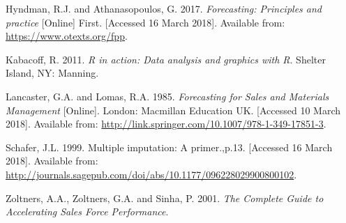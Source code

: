 \documentclass[11pt,]{article}
\begin{document}
\hypertarget{ref-hyndman_forecasting:_2017}{}
Hyndman, R.J. and Athana­sopou­los, G. 2017. \emph{Forecasting:
Principles and practice} {[}Online{]} First. {[}Accessed 16 March
2018{]}. Available from: \url{https://www.otexts.org/fpp}.

\hypertarget{ref-kabacoff_r_2011}{}
Kabacoff, R. 2011. \emph{R in action: Data analysis and graphics with
R}. Shelter Island, NY: Manning.

\hypertarget{ref-lancaster_forecasting_1985}{}
Lancaster, G.A. and Lomas, R.A. 1985. \emph{Forecasting for Sales and
Materials Management} {[}Online{]}. London: Macmillan Education UK.
{[}Accessed 10 March 2018{]}. Available from:
\url{http://link.springer.com/10.1007/978-1-349-17851-3}.

\hypertarget{ref-schafer_multiple_1999}{}
Schafer, J.L. 1999. Multiple imputation: A primer.,p.13. {[}Accessed 16
March 2018{]}. Available from:
\url{http://journals.sagepub.com/doi/abs/10.1177/096228029900800102}.

\hypertarget{ref-zoltners_complete_2001}{}
Zoltners, A.A., Zoltners, G.A. and Sinha, P. 2001. \emph{The Complete
Guide to Accelerating Sales Force Performance}.
\end{document}
